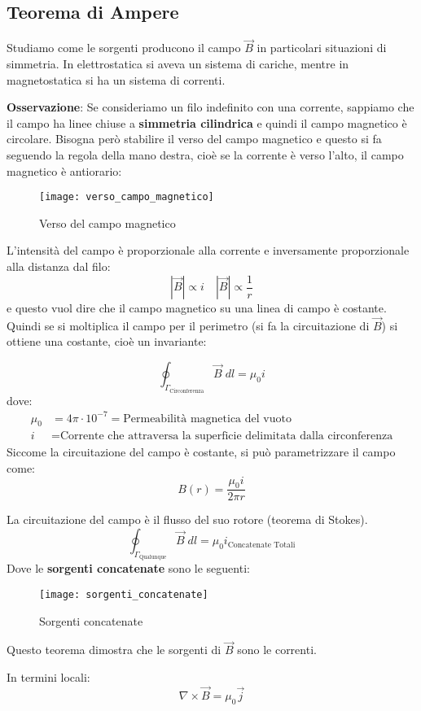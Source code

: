 \documentclass[a4paper]{article}
\begin{document}
\subsection{Teorema di Ampere}
Studiamo come le sorgenti producono il campo \( \vec{B} \) in particolari situazioni
di simmetria. In elettrostatica si aveva un sistema di cariche, mentre in magnetostatica
si ha un sistema di correnti.

\vspace{1em}
\noindent
\textbf{Osservazione}: Se consideriamo un filo indefinito con una corrente, sappiamo che
il campo ha linee chiuse a \textbf{simmetria cilindrica} e quindi il campo magnetico
è circolare. Bisogna però stabilire il verso del campo magnetico e questo si fa seguendo
la regola della mano destra, cioè se la corrente è verso l'alto, il campo magnetico
è antiorario:
\begin{figure}[H]
  \centering
  \texttt{[image: verso\_campo\_magnetico]}
  \caption{Verso del campo magnetico}
\end{figure}
\noindent
L'intensità del campo è proporzionale alla corrente e inversamente proporzionale alla
distanza dal filo:
\[
  |\vec{B}| \propto i \quad |\vec{B}| \propto \frac{1}{r}
\] 
e questo vuol dire che il campo magnetico su una linea di campo è costante. Quindi se
si moltiplica il campo per il perimetro (si fa la circuitazione di \( \vec{B} \)) si
ottiene una costante, cioè un invariante:
\begin{definition}
  \[
    \oint_{\Gamma_{\text{Circonferenza}}} \vec{B} \; dl = \mu_0 i
  \] 
  dove:
  \[
    \begin{aligned}
      \mu_0 & = 4 \pi \cdot 10^{-7} = \text{Permeabilità magnetica del vuoto} \\
      i & = \text{Corrente che attraversa la superficie delimitata dalla circonferenza}
    \end{aligned}
  \] 
  Siccome la circuitazione del campo è costante, si può parametrizzare il campo come:
  \[
    B(r) = \frac{\mu_0 i}{2 \pi r}
  \] 
\end{definition}

\begin{theorem}
  La circuitazione del campo è il flusso del suo rotore (teorema di Stokes).
  \[
    \oint_{\Gamma_{\text{Qualunque}}} \vec{B} \; dl = \mu_0 i_{\text{Concatenate Totali}}
  \] 
  Dove le \textbf{sorgenti concatenate} sono le seguenti:
  \begin{figure}[H]
    \centering
    \texttt{[image: sorgenti\_concatenate]}
    \caption{Sorgenti concatenate}
  \end{figure}
  \noindent
  Questo teorema dimostra che le sorgenti di \( \vec{B} \) sono le correnti.

  In termini locali:
  \[
    \nabla \times \vec{B} = \mu_0 \vec{j}
  \] 
\end{theorem}
\end{document}
